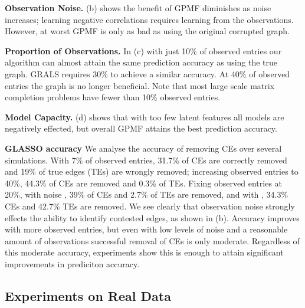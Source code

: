 \documentclass{article}
\theoremstyle{plain}
\theoremstyle{definition}
\theoremstyle{remark}
\begin{document}
\textbf{Observation Noise.} 
 (b)  shows the benefit of GPMF diminishes as noise increases; learning negative correlations requires learning from the observations. However, at worst GPMF is only as bad as using the original corrupted graph.

\textbf{Proportion of Observations.} 
In  (c)  with just 10\% of observed entries our algorithm can almost attain the same prediction accuracy as using the true graph. GRALS requires 30\% to achieve a similar accuracy. At 40\% of observed entries the graph is no longer beneficial. Note that most large scale matrix completion problems have fewer than 10\% observed entries.

\textbf{Model Capacity.}  (d)  shows that with too few latent features all models are negatively effected, but overall GPMF attains the best prediction accuracy.





\textbf{GLASSO accuracy} We analyse the accuracy of removing CEs over several simulations. With 7\% of observed entries, 31.7\% of CEs are correctly removed and 19\% of true edges (TEs) are wrongly removed; increasing observed entries to 40\%, 44.3\% of CEs are removed and 0.3\% of TEs. Fixing observed entries at 20\%, with noise , 39\% of CEs and 2.7\% of TEs are removed, and with , 34.3\% CEs and 42.7\% TEs are removed. We see clearly that observation noise strongly effects the ability to identify contested edges, as shown in  (b).  Accuracy improves with more observed entries, but even with low levels of noise and a reasonable amount of observations successful removal of CEs is only moderate. Regardless of this moderate accuracy, experiments show this is enough to attain significant improvements in prediciton accuracy.






\subsection{Experiments on Real Data}
\label{sec:real_data_experiments}
\end{document}
